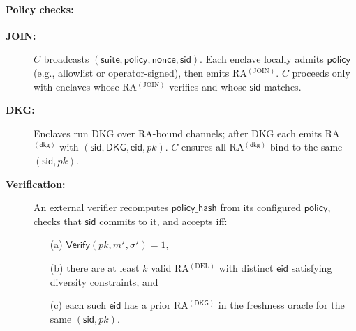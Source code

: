 \documentclass[runningheads,orivec]{llncs}
\begin{document}
\paragraph{Policy checks:}
\begin{description}
  \item[\textbf{JOIN:}] $C$ broadcasts $(\mathsf{suite},\mathsf{policy},\mathsf{nonce},\mathsf{sid})$.
  Each enclave locally admits $\mathsf{policy}$ (e.g., allowlist or operator-signed), then emits RA$^{(\mathrm{JOIN})}$.
  $C$ proceeds only with enclaves whose RA$^{(\mathrm{JOIN})}$ verifies and whose $\mathsf{sid}$ matches.
  \item[\textbf{DKG:}] Enclaves run DKG over RA-bound channels; after DKG each emits RA$^{(\mathsf{dkg})}$ with $(\mathsf{sid},\mathsf{DKG},\mathsf{eid},pk)$.
  $C$ ensures all RA$^{(\mathsf{dkg})}$ bind to the same $(\mathsf{sid},pk)$.
  \item[\textbf{Verification:}] An external verifier recomputes $\mathsf{policy\_hash}$ from its configured $\mathsf{policy}$,
  checks that $\mathsf{sid}$ commits to it, and accepts iff:
  \begin{enumerate}
    \item[(a)] $\mathsf{Verify}(pk,m^{\star},\sigma^{\star})=1$,
    \item[(b)] there are at least $k$ valid RA$^{(\mathrm{DEL})}$ with distinct $\mathsf{eid}$ satisfying diversity constraints, and
    \item[(c)] each such $\mathsf{eid}$ has a prior RA$^{(\mathsf{DKG})}$ in the freshness oracle for the same $(\mathsf{sid},pk)$.
  \end{enumerate}
\end{description}
\end{document}
